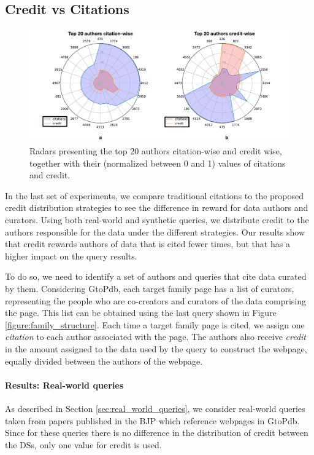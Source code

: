 \documentclass[preprint,12pt,sort&compress]{elsarticle}
\newcommand{\eat}[1]{}
\newcommand{\scream}[1]{{\bf * #1 *}{\typeout{#1}}}
\begin{document}

\subsection{Credit vs Citations}

\begin{figure}[]
\centering
  \includegraphics[width=1\textwidth]{2_radars}
  \caption{Radars presenting the top 20 authors citation-wise and credit wise, together with their (normalized between 0 and 1) values of citations and credit.}
  \label{figure:2_radars}
\end{figure}

In the last set of experiments, we compare traditional citations to the proposed credit distribution strategies to see the difference in reward for data authors and curators.  
\textcolor{correction}{Using both real-world and synthetic queries, we distribute credit to the authors responsible for the data under the different strategies. Our results show that credit rewards authors of data that is cited fewer times, but that has a higher impact on the query results.} 

\textcolor{correction}{To do so, we need to identify a set of authors and queries that cite data curated by them.}  
Considering GtoPdb, each target family page has a list of curators, representing the people who are co-creators and curators of the data comprising the page. This list can be obtained using the last query shown in Figure \ref{figure:family_structure}. 
Each time a target family page is cited, we assign one {\em citation} to each author associated with the page.  The authors also receive {\em credit} in the amount assigned to the data used by the query to construct the webpage, equally divided between the authors of the webpage.


\paragraph{Results: Real-world queries}
As described in Section \ref{sec:real_world_queries}, we consider real-world queries taken from papers published in the BJP which reference webpages in GtoPdb.
Since for these queries there is no difference in the distribution of credit between the DSs, only one value for credit is used.
\end{document}

